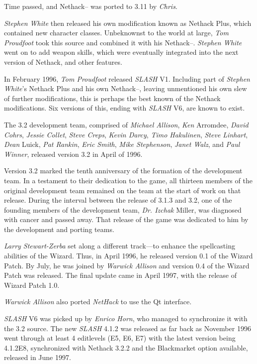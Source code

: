 Time passed,  and Nethack-- was ported to 3.11 by {\it Chris}.

{\it Stephen White\/} then released his own modification known as
Nethack Plus,  which contained new character classes.  Unbeknownst
to the world at large,  {\it Tom Proudfoot\/} took this source and
combined it with his Nethack--.  {\it Stephen White\/} went on to add
weapon skills,  which were eventually integrated into the next version
of Nethack,  and other features.

In February 1996,  {\it Tom Proudfoot\/} released {\it SLASH\/} V1.  Including
part of {\it Stephen White\/}'s Nethack Plus and his own Nethack--,  leaving
unmentioned his own slew of further modifications,  this is perhaps
the best known of the Nethack modifications.  Six versions of this,  ending
with {\it SLASH\/} V6,  are known to exist.

The 3.2 development team, comprised of {\it Michael Allison}, {\it Ken}
Arromdee, {\it David Cohrs}, {\it Jessie Collet}, {\it Steve Creps},
{\it Kevin Darcy}, {\it Timo Hakulinen}, {\it Steve Linhart}, {\it Dean}
Luick, {\it Pat Rankin}, {\it Eric Smith}, {\it Mike Stephenson},
{\it Janet Walz}, and {\it Paul Winner}, released version 3.2 in April of
1996.

Version 3.2 marked the tenth anniversary of the formation of the development
team.  In a testament to their dedication to the game, all thirteen members
of the original development team remained on the team at the start of work
on that release.  During the interval between the release of 3.1.3
and 3.2, one of the founding members of the development team, {\it Dr. Izchak}
Miller, was diagnosed with cancer and passed away.  That release of the
game was dedicated to him by the development and porting teams.

{\it Larry Stewart-Zerba\/} set along a different track---to enhance the
spellcasting abilities of the Wizard.   Thus, in April 1996,  he released
version 0.1 of the Wizard Patch.  By July,  he was joined by
{\it Warwick Allison\/} and version 0.4 of the Wizard Patch was released.
The final update came in April 1997,  with the release of
Wizard Patch 1.0.

{\it Warwick Allison\/} also ported {\it NetHack\/} to use the Qt interface.

{\it SLASH\/} V6 was picked up by {\it Enrico Horn}, who managed to synchronize it with
the 3.2 source.  The new {\it SLASH\/} 4.1.2 was released as far back as November
1996 went through at least 4 editlevels (E5, E6, E7)
with the latest version being 4.1.2E8,  synchronized with Nethack 3.2.2 and
the Blackmarket option available,  released in June 1997.


